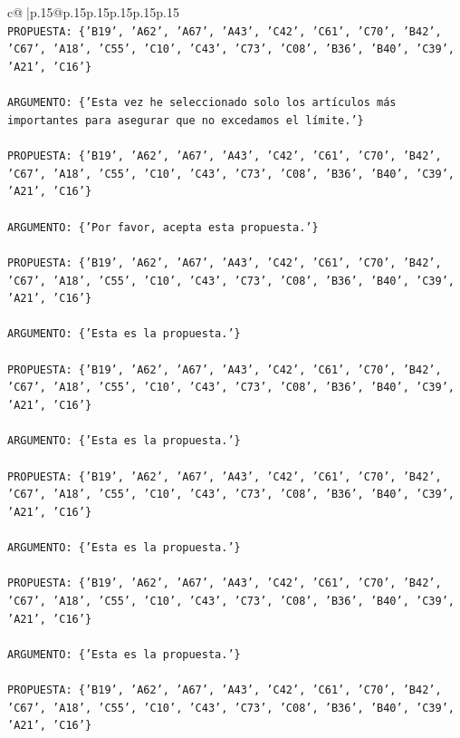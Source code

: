 \documentclass{article}
\begin{document}
{\begin{supertabular}{c@{$\;$}|p{.15\linewidth}@{}p{.15\linewidth}p{.15\linewidth}p{.15\linewidth}p{.15\linewidth}p{.15\linewidth}}
{{{\\ 
\texttt{PROPUESTA: \{'B19', 'A62', 'A67', 'A43', 'C42', 'C61', 'C70', 'B42', 'C67', 'A18', 'C55', 'C10', 'C43', 'C73', 'C08', 'B36', 'B40', 'C39', 'A21', 'C16'\}} \\
\\ 
\texttt{ARGUMENTO: \{'Esta vez he seleccionado solo los artículos más importantes para asegurar que no excedamos el límite.'\}} \\
\\ 
\texttt{PROPUESTA: \{'B19', 'A62', 'A67', 'A43', 'C42', 'C61', 'C70', 'B42', 'C67', 'A18', 'C55', 'C10', 'C43', 'C73', 'C08', 'B36', 'B40', 'C39', 'A21', 'C16'\}} \\
\\ 
\texttt{ARGUMENTO: \{'Por favor, acepta esta propuesta.'\}} \\
\\ 
\texttt{PROPUESTA: \{'B19', 'A62', 'A67', 'A43', 'C42', 'C61', 'C70', 'B42', 'C67', 'A18', 'C55', 'C10', 'C43', 'C73', 'C08', 'B36', 'B40', 'C39', 'A21', 'C16'\}} \\
\\ 
\texttt{ARGUMENTO: \{'Esta es la propuesta.'\}} \\
\\ 
\texttt{PROPUESTA: \{'B19', 'A62', 'A67', 'A43', 'C42', 'C61', 'C70', 'B42', 'C67', 'A18', 'C55', 'C10', 'C43', 'C73', 'C08', 'B36', 'B40', 'C39', 'A21', 'C16'\}} \\
\\ 
\texttt{ARGUMENTO: \{'Esta es la propuesta.'\}} \\
\\ 
\texttt{PROPUESTA: \{'B19', 'A62', 'A67', 'A43', 'C42', 'C61', 'C70', 'B42', 'C67', 'A18', 'C55', 'C10', 'C43', 'C73', 'C08', 'B36', 'B40', 'C39', 'A21', 'C16'\}} \\
\\ 
\texttt{ARGUMENTO: \{'Esta es la propuesta.'\}} \\
\\ 
\texttt{PROPUESTA: \{'B19', 'A62', 'A67', 'A43', 'C42', 'C61', 'C70', 'B42', 'C67', 'A18', 'C55', 'C10', 'C43', 'C73', 'C08', 'B36', 'B40', 'C39', 'A21', 'C16'\}} \\
\\ 
\texttt{ARGUMENTO: \{'Esta es la propuesta.'\}} \\
\\ 
\texttt{PROPUESTA: \{'B19', 'A62', 'A67', 'A43', 'C42', 'C61', 'C70', 'B42', 'C67', 'A18', 'C55', 'C10', 'C43', 'C73', 'C08', 'B36', 'B40', 'C39', 'A21', 'C16'\}} \\
}}}
\end{supertabular}}
\end{document}
